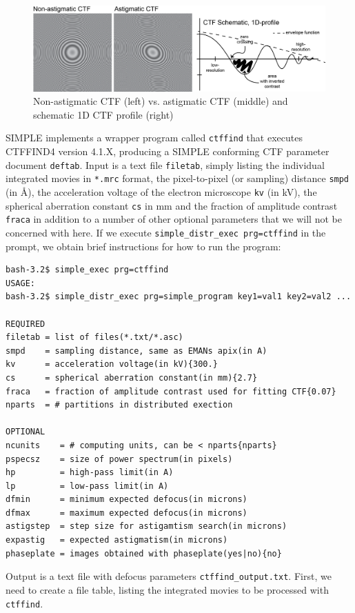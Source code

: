 \documentclass[a4paper,11pt]{article}
\newcommand{\prgname}[1]{\textcolor{NavyBlue}{\texttt{#1}}}
\begin{document}
\begin{figure}
\includegraphics[keepaspectratio=true,scale=0.8 ]{./astigctf/astigctf}
\caption{Non-astigmatic CTF (left) vs. astigmatic CTF (middle) and schematic 1D CTF profile (right)}
\end{figure}

SIMPLE implements a wrapper program called \prgname{ctffind} that executes CTFFIND4 \citep{rohou2015ctffind4} version 4.1.X, producing a SIMPLE conforming CTF parameter document \texttt{deftab}. Input is a text file \texttt{filetab}, simply listing the individual integrated movies in \texttt{*.mrc} format, the pixel-to-pixel (or sampling) distance \texttt{smpd} (in \AA{}), the acceleration voltage of the electron microscope \texttt{kv} (in kV), the spherical aberration constant \texttt{cs} in mm and the fraction of amplitude contrast \texttt{fraca} in addition to a number of other optional parameters that we will not be concerned with here. If we execute \texttt{simple\_distr\_exec prg=ctffind} in the prompt, we obtain brief instructions for how to run the program:
\begin{verbatim}
bash-3.2$ simple_exec prg=ctffind
USAGE:
bash-3.2$ simple_distr_exec prg=simple_program key1=val1 key2=val2 ...

REQUIRED
filetab = list of files(*.txt/*.asc)
smpd    = sampling distance, same as EMANs apix(in A)
kv      = acceleration voltage(in kV){300.}
cs      = spherical aberration constant(in mm){2.7}
fraca   = fraction of amplitude contrast used for fitting CTF{0.07}
nparts  = # partitions in distributed exection

OPTIONAL
ncunits    = # computing units, can be < nparts{nparts}
pspecsz    = size of power spectrum(in pixels)
hp         = high-pass limit(in A)
lp         = low-pass limit(in A)
dfmin      = minimum expected defocus(in microns)
dfmax      = maximum expected defocus(in microns)
astigstep  = step size for astigamtism search(in microns)
expastig   = expected astigmatism(in microns)
phaseplate = images obtained with phaseplate(yes|no){no}
\end{verbatim}
Output is a text file with defocus parameters \texttt{ctffind\_output.txt}. First, we need to create a file table, listing the integrated movies to be processed with  \prgname{ctffind}.
\end{document}
